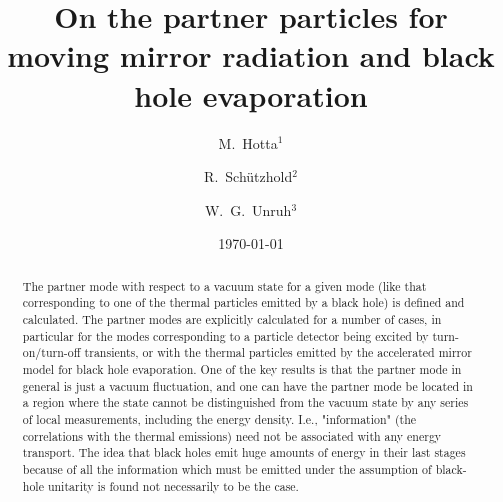 \documentclass[aps,prd,showpacs,amssymb,nofootinbib,twocolumn]{revtex4}
\begin{document}
\title{
On the partner particles for moving mirror radiation and black hole evaporation}

\author{M.~Hotta$^1$}
\author{ R.~Sch\"utzhold$^2$}
\author{W.~G.~Unruh$^3$}


\date{\today}

\begin{abstract}
The partner mode with respect to a vacuum state for a given mode (like
that corresponding to one of the thermal particles emitted by a black hole) 
is defined and calculated. 
%
The partner modes are explicitly calculated for a number of cases, 
in particular for the modes corresponding to a particle detector being 
excited by turn-on/turn-off transients, or with the thermal particles 
emitted by the accelerated mirror model for black hole evaporation. 
%
One of the key results is that the partner mode in general is just a vacuum 
fluctuation, and one can have the partner mode be located in a region where 
the state cannot be distinguished from the vacuum state by any series of 
local measurements, including the energy density. 
%
I.e., "information" (the correlations with the thermal emissions) need not be 
associated with any energy transport. 
%
The idea that black holes emit huge amounts of energy in their last stages 
because of all the information which must be emitted under the assumption 
of black-hole unitarity is found not necessarily to be the case.
\end{abstract}


\maketitle
\end{document}

